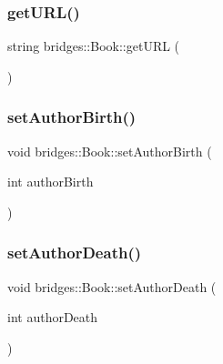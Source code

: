 \subsubsection{\texorpdfstring{get\+U\+R\+L()}{getURL()}}
{\footnotesize\ttfamily string bridges\+::\+Book\+::get\+U\+RL (\begin{DoxyParamCaption}{ }\end{DoxyParamCaption})\hspace{0.3cm}{\ttfamily [inline]}}

\hypertarget{classbridges_1_1_book_adca4d6766fa0068e23926ae95ed8411f}{}\label{classbridges_1_1_book_adca4d6766fa0068e23926ae95ed8411f} 
\subsubsection{\texorpdfstring{set\+Author\+Birth()}{setAuthorBirth()}}
{\footnotesize\ttfamily void bridges\+::\+Book\+::set\+Author\+Birth (\begin{DoxyParamCaption}\item[{int}]{author\+Birth }\end{DoxyParamCaption})\hspace{0.3cm}{\ttfamily [inline]}}

\hypertarget{classbridges_1_1_book_a044ad1b1b6418d7545c6f957b2757bcd}{}\label{classbridges_1_1_book_a044ad1b1b6418d7545c6f957b2757bcd} 
\subsubsection{\texorpdfstring{set\+Author\+Death()}{setAuthorDeath()}}
{\footnotesize\ttfamily void bridges\+::\+Book\+::set\+Author\+Death (\begin{DoxyParamCaption}\item[{int}]{author\+Death }\end{DoxyParamCaption})\hspace{0.3cm}{\ttfamily [inline]}}

\hypertarget{classbridges_1_1_book_affc38232dda1e6b04d7e38a02cdd9c39}{}\label{classbridges_1_1_book_affc38232dda1e6b04d7e38a02cdd9c39} 
